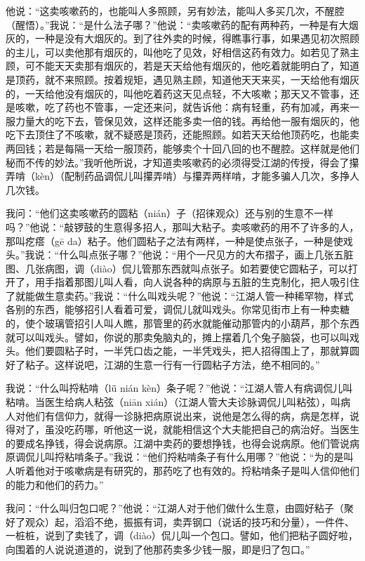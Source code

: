 \documentclass[12pt,UTF8]{ctexbook}
\begin{document}
他说：“这卖咳嗽药的，也能叫人多照顾，另有妙法，能叫人多买几次，不醒腔（醒悟）。”我说：“是什么法子哪？”他说：“卖咳嗽药的配有两种药，一种是有大烟灰的，一种是没有大烟灰的。到了往外卖的时候，得瞧事行事，如果遇见初次照顾的主儿，可以卖他那有烟灰的，叫他吃了见效，好相信这药有效力。如若见了熟主顾，可不能天天卖那有烟灰的，若是天天给他有烟灰的，他吃着就能明白了，知道是顶药，就不来照顾。按着规矩，遇见熟主顾，知道他天天来买，一天给他有烟灰的，一天给他没有烟灰的，叫他吃着药这天见点轻，不大咳嗽；那天又不管事，还是咳嗽，吃了药也不管事，一定还来问，就告诉他：病有轻重，药有加减，再来一服力量大的吃下去，管保见效，这样还能多卖一倍的钱。再给他一服有烟灰的，他吃下去顶住了不咳嗽，就不疑惑是顶药，还能照顾。如若天天给他顶药吃，也能卖两回钱；若是每隔一天给一服顶药，能够卖个十回八回的也不醒腔。这样就是他们秘而不传的妙法。”我听他所说，才知道卖咳嗽药的必须得受江湖的传授，得会了攥弄啃（kèn）（配制药品调侃儿叫攥弄啃）与攥弄两样啃，才能多骗人几次，多挣人几次钱。

我问：“他们这卖咳嗽药的圆粘（nián）子（招徕观众）还与别的生意不一样吗？”他说：“敲锣鼓的生意得多招人，那叫大粘子。卖咳嗽药的用不了许多的人，那叫疙瘩（gē da）粘子。他们圆粘子之法有两样，一种是使点张子，一种是使戏头。”我说：“什么叫点张子哪？”他说：“用个一尺见方的大布摺子，画上几张五脏图、几张病图，调（diào）侃儿管那东西就叫点张子。如若要使它圆粘子，可以打开了，用手指着那图儿叫人看，向人说各种的病原与五脏的生克制化，把人吸引住了就能做生意卖药。”我说：“什么叫戏头呢？”他说：“江湖人管一种稀罕物，样式各别的东西，能够招引人看着可爱，调侃儿就叫戏头。你常见街市上有一种卖糖的，使个玻璃管招引人叫人瞧，那管里的药水就能催动那管内的小葫芦，那个东西就可以叫戏头。譬如，你说的那卖兔脑丸的，摊上摆着几个兔子脑袋，也可以叫戏头。他们要圆粘子时，一半凭口齿之能，一半凭戏头，把人招得围上了，那就算圆好了粘子。这样说吧，江湖的生意一行有一行圆粘子方法，绝不相同的。”

我说：“什么叫捋粘啃（lǖ nián kèn）条子呢？”他说：“江湖人管人有病调侃儿叫粘啃。当医生给病人粘弦（niān xián）（江湖人管大夫诊脉调侃儿叫粘弦），叫病人对他们有信仰力，就得一诊脉把病原说出来，说他是怎么得的病，病是怎样，说得对了，虽没吃药哪，听他这一说，就能相信这个大夫能把自己的病治好。当医生的要成名挣钱，得会说病原。江湖中卖药的要想挣钱，也得会说病原。他们管说病原调侃儿叫捋粘啃条子。”我说：“他们捋粘啃条子有什么用哪？”他说：“为的是叫人听着他对于咳嗽病是有研究的，那药吃了也有效的。捋粘啃条子是叫人信仰他们的能力和他们的药力。”

我问：“什么叫归包口呢？”他说：“江湖人对于他们做什么生意，由圆好粘子（聚好了观众）起，滔滔不绝，振振有词，卖弄钢口（说话的技巧和分量），一件件、一桩桩，说到了卖钱了，调（diào）侃儿叫一个包口。譬如，他们把粘子圆好啦，向围着的人说说道道的，说到了他那药卖多少钱一服，即是归了包口。”
\end{document}
